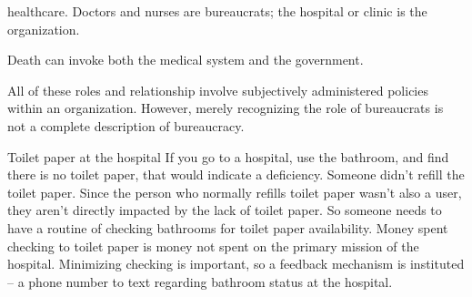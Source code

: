 healthcare. Doctors and nurses are bureaucrats; the hospital or clinic is the organization. 


Death can invoke both the medical system and the government. 





All of these roles and relationship involve subjectively administered policies within an organization. However, merely recognizing the role of bureaucrats is not a complete description of bureaucracy. 



Toilet paper at the hospital
If you go to a hospital, use the bathroom, and find there is no toilet paper, that would indicate a deficiency.
Someone didn't refill the toilet paper. Since the person who normally refills toilet paper wasn't also a user, they aren't directly impacted by the lack of toilet paper.
So someone needs to have a routine of checking bathrooms for toilet paper availability. Money spent checking to toilet paper is money not spent on the primary mission of the hospital.
Minimizing checking is important, so a feedback mechanism is instituted -- a phone number to text regarding bathroom status at the hospital.
